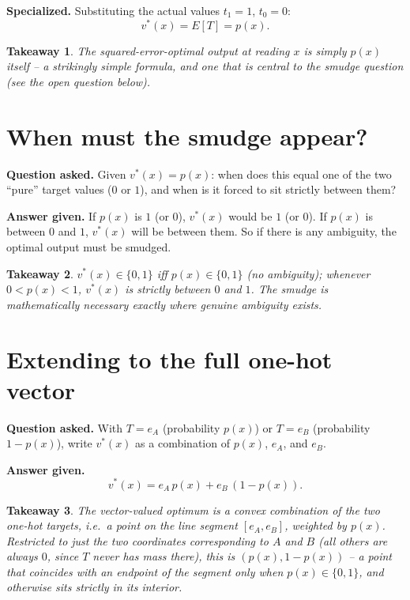 \documentclass[11pt]{article}
\newtheorem*{takeaway}{Takeaway}
\begin{document}
\textbf{Specialized.} Substituting the actual values $t_1=1$, $t_0=0$:
\[
  v^\ast(x) = E[T] = p(x).
\]

\begin{takeaway}
The squared-error-optimal output at reading $x$ is simply $p(x)$ itself --
a strikingly simple formula, and one that is central to the smudge
question (see the open question below).
\end{takeaway}

\section{When must the smudge appear?}

\textbf{Question asked.} Given $v^\ast(x) = p(x)$: when does this equal one
of the two ``pure'' target values ($0$ or $1$), and when is it forced to
sit strictly between them?

\textbf{Answer given.} If $p(x)$ is $1$ (or $0$), $v^\ast(x)$ would be $1$
(or $0$). If $p(x)$ is between $0$ and $1$, $v^\ast(x)$ will be between
them. So if there is any ambiguity, the optimal output must be smudged.

\begin{takeaway}
$v^\ast(x) \in \{0,1\}$ iff $p(x) \in \{0,1\}$ (no ambiguity); whenever
$0<p(x)<1$, $v^\ast(x)$ is strictly between $0$ and $1$. The smudge is
mathematically necessary exactly where genuine ambiguity exists.
\end{takeaway}

\section{Extending to the full one-hot vector}

\textbf{Question asked.} With $T=e_A$ (probability $p(x)$) or $T=e_B$
(probability $1-p(x)$), write $v^\ast(x)$ as a combination of $p(x)$,
$e_A$, and $e_B$.

\textbf{Answer given.}
\[
  v^\ast(x) = e_A\, p(x) + e_B\,(1-p(x)).
\]

\begin{takeaway}
The vector-valued optimum is a convex combination of the two one-hot
targets, i.e.\ a point on the line segment $[e_A, e_B]$, weighted by
$p(x)$. Restricted to just the two coordinates corresponding to $A$ and
$B$ (all others are always $0$, since $T$ never has mass there), this is
$(p(x), 1-p(x))$ -- a point that coincides with an endpoint of the segment
only when $p(x)\in\{0,1\}$, and otherwise sits strictly in its interior.
\end{takeaway}
\end{document}
